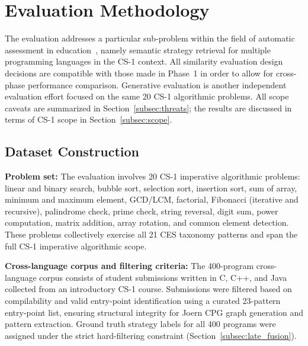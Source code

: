 \section{Evaluation Methodology}
\label{sec:evaluation_setup}

The evaluation addresses a particular sub-problem within the field of automatic assessment in education~\cite{ref_ihantola2010,ref_paiva2022}, namely semantic strategy retrieval for multiple programming languages in the CS-1 context. All similarity evaluation design decisions are compatible with those made in Phase~1 in order to allow for cross-phase performance comparison. Generative evaluation is another independent evaluation effort focused on the same 20 CS-1 algorithmic problems. All scope caveats are summarized in Section~\ref{subsec:threats}; the results are discussed in terms of CS-1 scope in Section~\ref{subsec:scope}.

\subsection{Dataset Construction}
\label{subsec:dataset_construction}

\textbf{Problem set:} The evaluation involves 20 CS-1 imperative algorithmic problems: linear and binary search, bubble sort, selection sort, insertion sort, sum of array, minimum and maximum element, GCD/LCM, factorial, Fibonacci (iterative and recursive), palindrome check, prime check, string reversal, digit sum, power computation, matrix addition, array rotation, and common element detection. These problems collectively exercise all 21 CES taxonomy patterns and span the full CS-1 imperative algorithmic scope.


\textbf{Cross-language corpus and filtering criteria:} The 400-program cross-language corpus consists of student submissions written in C, C++, and Java collected from an introductory CS-1 course. Submissions were filtered based on compilability and valid entry-point identification using a curated 23-pattern entry-point list, ensuring structural integrity for Joern CPG graph generation and pattern extraction. Ground truth strategy labels for all 400 programs were assigned under the strict hard-filtering constraint (Section~\ref{subsec:late_fusion}).

